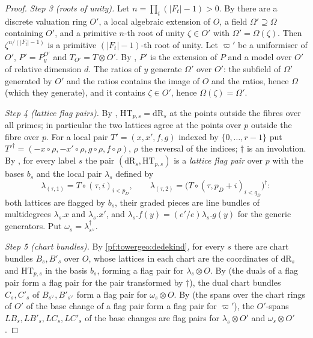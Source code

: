 \begin{proof}
\emph{Step 3 (roots of unity).} Let $n=\prod_t(|F_t|-1)>0$. By
 there are a discrete valuation ring $O'$, a local
algebraic extension of $O$, a field $\Omega'\supseteq\Omega$ containing $O'$, and a primitive $n$-th root of
unity $\zeta\in O'$ with $\Omega'=\Omega(\zeta)$. Then $\zeta^{n/(|F_t|-1)}$ is a primitive
$(|F_t|-1)$-th root of unity. Let $\varpi'$ be a uniformiser of $O'$, $P'=P^{O'}_y$ and $T_{O'}=T\otimes O'$.
By , $P'$ is the extension of $P$ and a model over $O'$ of
relative dimension $d$. The ratios of $y$ generate $\Omega'$ over $O'$: the subfield of $\Omega'$ generated by
$O'$ and the ratios contains the image of $O$ and the ratios, hence $\Omega$ (which they generate), and it
contains $\zeta\in O'$, hence $\Omega(\zeta)=\Omega'$.

\emph{Step 4 (lattice flag pairs).} By ,
$\mathrm{HT}_{p,s}=\mathrm{dR}_s$ at the points outside the fibres over all primes; in particular the two
lattices agree at the points over $p$ outside the fibre over $p$. For a local pair $T'=(x,x',f,g)$ indexed
by $\{0,\dots,r-1\}$ put $T'^\dagger=(-x\circ\rho,-x'\circ\rho,g\circ\rho,f\circ\rho)$, $\rho$ the reversal of
the indices; $\dagger$ is an involution. By , for every
label $s$ the pair $(\mathrm{dR}_s,\mathrm{HT}_{p,s})$ is a \emph{lattice flag pair} over $p$ with the bases
$b_s$ and the local pair $\lambda_s$ defined by
\[
\lambda_{(\tau,1)}=T\circ(\tau,i)_{i<p_D},\qquad\lambda_{(\tau,2)}=\bigl(T\circ(\tau,p_D+i)_{i<q_D}\bigr)^\dagger:
\]
both lattices are flagged by $b_s$, their graded pieces are line bundles of multidegrees $\lambda_s.x$ and
$\lambda_s.x'$, and $\lambda_s.f(y)=(e'/e)\lambda_s.g(y)$ for the generic generators. Put
$\omega_s=\lambda_{s^\vee}^\dagger$.

\emph{Step 5 (chart bundles).} By \cref{pf:towergeo:dedekind}, for every $s$
there are chart bundles $B_s,B'_s$ over $O$, whose lattices in each chart are the coordinates of
$\mathrm{dR}_s$ and $\mathrm{HT}_{p,s}$ in the basis $b_s$, forming a flag pair for $\lambda_s\otimes O$. By
 (the duals of a flag pair form a flag pair for the
pair transformed by $\dagger$), the dual chart bundles $C_s,C'_s$ of $B_{s^\vee},B'_{s^\vee}$ form a flag pair
for $\omega_s\otimes O$. By  (the spans over the
chart rings of $O'$ of the base change of a flag pair form a flag pair for $\varpi'$), the $O'$-spans
$LB_s,LB'_s,LC_s,LC'_s$ of the base changes are flag pairs for $\lambda_s\otimes O'$ and $\omega_s\otimes O'$.


\end{proof}
